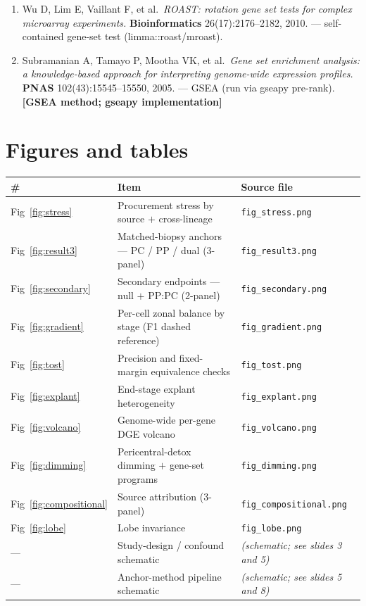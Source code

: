 \documentclass[11pt,a4paper]{article}
\begin{document}
\begin{enumerate}[leftmargin=1.6em]
  \item Wu D, Lim E, Vaillant F, et al.\ \emph{ROAST: rotation gene set tests for complex microarray experiments.} \textbf{Bioinformatics} 26(17):2176--2182, 2010. --- self-contained gene-set test (limma::roast/mroast).
  \item Subramanian A, Tamayo P, Mootha VK, et al.\ \emph{Gene set enrichment analysis: a knowledge-based approach for interpreting genome-wide expression profiles.} \textbf{PNAS} 102(43):15545--15550, 2005. --- GSEA (run via gseapy pre-rank). \textbf{[GSEA method; gseapy implementation]}
\end{enumerate}

\FloatBarrier
\section{Figures and tables}

\begin{table}[H]
\centering\small
\begin{tabular}{lll}
\toprule
\# & Item & Source file \\
\midrule
Fig~\ref{fig:stress} & Procurement stress by source $+$ cross-lineage & \texttt{fig\_stress.png} \\
Fig~\ref{fig:result3} & Matched-biopsy anchors --- PC / PP / dual (3-panel) & \texttt{fig\_result3.png} \\
Fig~\ref{fig:secondary} & Secondary endpoints --- null $+$ PP:PC (2-panel) & \texttt{fig\_secondary.png} \\
Fig~\ref{fig:gradient} & Per-cell zonal balance by stage (F1 dashed reference) & \texttt{fig\_gradient.png} \\
Fig~\ref{fig:tost} & Precision and fixed-margin equivalence checks & \texttt{fig\_tost.png} \\
Fig~\ref{fig:explant} & End-stage explant heterogeneity & \texttt{fig\_explant.png} \\
Fig~\ref{fig:volcano} & Genome-wide per-gene DGE volcano & \texttt{fig\_volcano.png} \\
Fig~\ref{fig:dimming} & Pericentral-detox dimming $+$ gene-set programs & \texttt{fig\_dimming.png} \\
Fig~\ref{fig:compositional} & Source attribution (3-panel) & \texttt{fig\_compositional.png} \\
Fig~\ref{fig:lobe} & Lobe invariance & \texttt{fig\_lobe.png} \\
--- & Study-design / confound schematic & \emph{(schematic; see slides 3 and 5)} \\
--- & Anchor-method pipeline schematic & \emph{(schematic; see slides 5 and 8)} \\
\bottomrule
\end{tabular}
\end{table}
\end{document}

